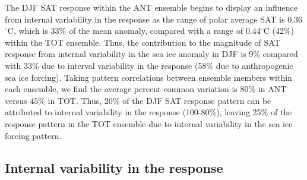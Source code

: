 \documentclass[twocol]{ametsoc}
\begin{document}
The DJF SAT response within the ANT ensemble begins to display an influence from internal variability in the response as the range of polar average SAT is 0.36$^\circ$C, which is 33\% of the mean anomaly, compared with a range of 0.44$^\circ$C (42\%) within the TOT ensemble. Thus, the contribution to the magnitude of SAT response from internal variability in the sea ice anomaly in DJF is 9\% compared with 33\% due to interval variability in the response (58\% due to anthropogenic sea ice forcing). Taking pattern correlations between ensemble members within each ensemble, we find the average percent common variation is 80\% in ANT versus 45\% in TOT. Thus, 20\% of the DJF SAT response pattern can be attributed to internal variability in the response (100-80\%), leaving 25\% of the response pattern in the TOT ensemble due to internal variability in the sea ice forcing pattern.

\subsection{Internal variability in the response}
\end{document}
